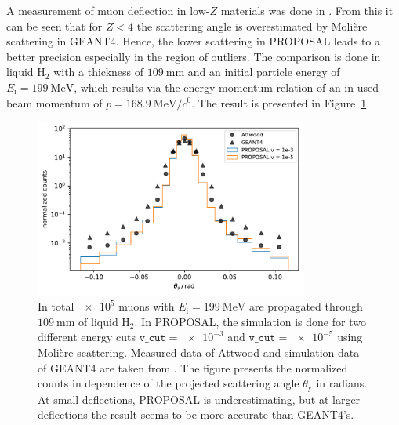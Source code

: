 \documentclass[pdflatex, sn-mathphys]{sn-jnl}%
\theoremstyle{thmstyleone}%
\theoremstyle{thmstyletwo}%
\theoremstyle{thmstylethree}%
\begin{document}
A measurement of muon deflection in low-$Z$ materials was done in \cite{attwood_2006}. 
From this it can be seen that for $Z < 4$ the scattering angle is overestimated 
by Molière scattering in GEANT4. Hence, the lower scattering in PROPOSAL leads 
to a better precision especially in the region of outliers. The comparison is 
done in liquid $\text{H}_2$ with a thickness of $\SI{109}{\milli\meter}$ and an 
initial particle energy of $E_{\mathrm{i}} = \SI{199}{\mega\electronvolt}$, which 
results via the energy-momentum relation of an in \cite{attwood_2006} used beam momentum 
of $p = \SI[per-mode=symbol]{168.9}{\mega\electronvolt\per\clight}$. 
The result is presented in Figure~\ref{fig:attwood_comparison}.
\begin{figure}
    \centering 
    \includegraphics[width=0.8\textwidth]{../../deflection/plots/FINAL/attwood_comparison_moliere_E199MeV_final.pdf}
    \caption{In total $\num{e5}$ muons with $E_{\mathrm{i}} = \SI{199}{\mega\electronvolt}$ are propagated through 
    $\SI{109}{\milli\meter}$ of liquid $\text{H}_2$. In PROPOSAL, the simulation is done 
    for two different energy cuts $\texttt{v\_cut} = \num{e-3}$ and $\texttt{v\_cut} = \num{e-5}$ using Molière scattering.
    Measured data of Attwood and simulation data of GEANT4 are taken from \cite{attwood_2006}. The figure presents 
    the normalized counts in dependence of the projected scattering angle $\theta_{\mathrm{y}}$ in radians. At small deflections, PROPOSAL 
    is underestimating, but at larger deflections the result seems to be more accurate than GEANT4's.}
    \label{fig:attwood_comparison}
\end{figure}
\end{document}

